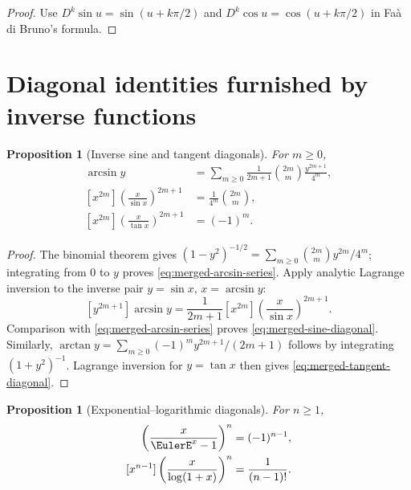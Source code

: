 \documentclass[11pt,a4paper,oneside,openany]{book}
\newtheorem{proposition}[theorem]{Proposition}
\theoremstyle{definition}
\theoremstyle{remark}
\begin{document}
\begin{proof}
Use $D^k\sin u=\sin(u+k\pi/2)$ and
$D^k\cos u=\cos(u+k\pi/2)$ in Fa\`a di Bruno's formula.
\end{proof}

\section{Diagonal identities furnished by inverse functions}

\begin{proposition}[Inverse sine and tangent diagonals]
For $m\geq0$,
\begin{align}
 \arcsin y
 &=\sum_{m\geq0}\frac1{2m+1}\binom{2m}{m}
      \frac{y^{2m+1}}{4^m},                                       \label{eq:merged-arcsin-series}\\
 [x^{2m}]\left(\frac{x}{\sin x}\right)^{2m+1}
 &=\frac1{4^m}\binom{2m}{m},                                      \label{eq:merged-sine-diagonal}\\
 [x^{2m}]\left(\frac{x}{\tan x}\right)^{2m+1}
 &=(-1)^m.                                                         \label{eq:merged-tangent-diagonal}
\end{align}
\end{proposition}

\begin{proof}
The binomial theorem gives
$(1-y^2)^{-1/2}=\sum_{m\geq0}\binom{2m}{m}y^{2m}/4^m$; integrating
from $0$ to $y$ proves \eqref{eq:merged-arcsin-series}.  Apply analytic
Lagrange inversion to the inverse pair $y=\sin x$, $x=\arcsin y$:
\[
 [y^{2m+1}]\arcsin y
 =\frac1{2m+1}[x^{2m}]
   \left(\frac{x}{\sin x}\right)^{2m+1}.
\]
Comparison with \eqref{eq:merged-arcsin-series} proves
\eqref{eq:merged-sine-diagonal}.  Similarly,
$\arctan y=\sum_{m\geq0}(-1)^my^{2m+1}/(2m+1)$ follows by integrating
$(1+y^2)^{-1}$.  Lagrange inversion for $y=\tan x$ then gives
\eqref{eq:merged-tangent-diagonal}.
\end{proof}

\begin{proposition}[Exponential--logarithmic diagonals]
For $n\geq1$,
\begin{align}
 [x^{n-1}]\left(\frac{x}{\EulerE^x-1}\right)^n&=(-1)^{n-1},              \label{eq:merged-norlund-diagonal}\\
 [x^{n-1}]\left(\frac{x}{\log(1+x)}\right)^n&=\frac1{(n-1)!}.     \label{eq:merged-cauchy-diagonal}
\end{align}
\end{proposition}
\end{document}

